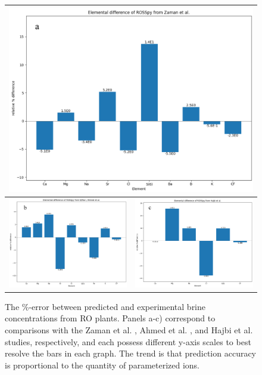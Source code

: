 \begin{figure}
    \centering
    \begin{tabular}{c|c}
        \multicolumn{2}{c}{\includegraphics[width=\linewidth]{images/ROSSpy/case_studies/Zaman_comparison.png}} \\ \midrule
        \includegraphics[width=0.49\linewidth]{images/ROSSpy/case_studies/Ahmed_comparison.png} & 
        \includegraphics[width=0.49\linewidth]{images/ROSSpy/case_studies/Hajbi_comparison.png} \\ \bottomrule
    \end{tabular}
    \caption{
        The \%-error between predicted and experimental brine concentrations from RO plants. Panels a-c) correspond to comparisons with the Zaman et al. \cite{Zaman2015DownstreamCompounds}, Ahmed et al. \cite{Ahmed2001BrineEmirates}, and Hajbi et al. \cite{Hajbi2010ReuseBrine} studies, respectively, and each possess different y-axis scales to best resolve the bars in each graph. The trend is that prediction accuracy is proportional to the quantity of parameterized ions. 
    }
    \label{bar_graphs}
\end{figure}



